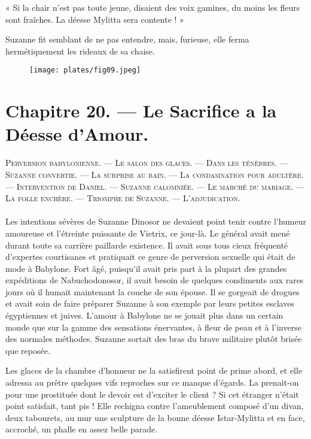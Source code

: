 \documentclass[a4paper, 11pt, oneside, polutonikogreek, french]{article}
\begin{document}
« Si la chair n'est pas toute jeune, disaient des voix gamines, du moins les fleurs sont fraîches. La déesse Mylitta sera contente ! »

Suzanne fit semblant de ne pas entendre, mais, furieuse, elle ferma hermétiquement les rideaux de sa chaise.
\clearpage
\begin{figure}[H]
\centering
\texttt{[image: plates/fig09.jpeg]}
\end{figure}
\section{Chapitre 20. --- Le Sacrifice a la Déesse d'Amour.}
\begin{center}
\scshape
\small
Perversion babylonienne. --- Le salon des glaces. --- Dans les ténèbres. --- Suzanne convertie. --- La surprise au bain. --- La condamnation pour adultère. --- Intervention de Daniel. --- Suzanne calomniée. --- Le marché du mariage. --- La folle enchère. --- Triomphe de Suzanne. --- L'adjudication.
\end{center}
\paragraph{}
Les intentions sévères de Suzanne Dinosor ne devaient point tenir contre l'humeur amoureuse et l'étreinte puissante de Vietrix, ce jour-là. Le général avait mené durant toute sa carrière paillarde existence. Il avait sous tous cieux fréquenté d'expertes courtisanes et pratiquait ce genre de perversion sexuelle qui était de mode à Babylone. Fort âgé, puisqu'il avait pris part à la plupart des grandes expéditions de Nabuchodonosor, il avait besoin de quelques condiments aux rares jours où il humait maintenant la couche de son épouse. Il se gorgeait de drogues et avait soin de faire préparer Suzanne à son exemple par leurs petites esclaves égyptiennes et juives. L'amour à Babylone ne se jouait plus dans un certain monde que sur la gamme des sensations énervantes, à fleur de peau et à l'inverse des normales méthodes. Suzanne sortait des bras du brave militaire plutôt brisée que reposée.

\bigskip
\centerline{\EightStarTaper}
\centerline{\EightStarTaper\EightStarTaper}
\bigskip

Les glaces de la chambre d'honneur ne la satisfirent point de prime abord, et elle adressa au prêtre quelques vifs reproches sur ce manque d'égards. La prenait-on pour une prostituée dont le devoir est d'exciter le client ? Si cet étranger n'était point satisfait, tant pis ! Elle rechigna contre l'ameublement composé d'un divan, deux tabourets, au mur une sculpture de la bonne déesse Istar-Mylitta et en face, accroché, un phalle en assez belle parade.
\end{document}
